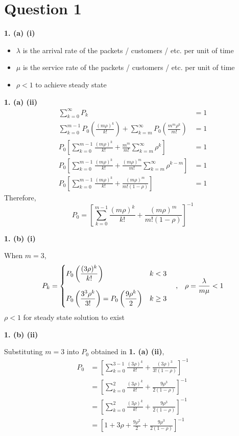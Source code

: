 \documentclass[12pt, a4paper]{article}
\begin{document}
\section*{Question 1}

\textbf{1. (a) (i)}
\begin{itemize}
  \item \(\lambda\) is the arrival rate of the packets / customers / etc. per unit of time
  \item \(\mu\) is the service rate of the packets / customers / etc. per unit of time
  \item \(\rho < 1\) to achieve steady state
\end{itemize}

\vspace{1cm}
\noindent \textbf{1. (a) (ii)}
\begin{align*}
  \sum_{k=0}^{\infty} P_k &= 1 \\
  \sum_{k=0}^{m-1} P_0\left(\frac{(m\rho)^k}{k!}\right) +
    \sum_{k=m}^{\infty} P_0\left(\frac{m^m\rho^k}{m!}\right) &= 1 \\
  P_0 \left[\sum_{k=0}^{m-1} \frac{(m\rho)^k}{k!} + \frac{m^m}{m!}\sum_{k=m}^{\infty} \rho^k \right] &= 1 \\
  P_0 \left[\sum_{k=0}^{m-1} \frac{(m\rho)^k}{k!} + \frac{(m\rho)^m}{m!}\sum_{k=m}^{\infty} \rho^{k-m} \right] &= 1 \\
  P_0 \left[\sum_{k=0}^{m-1} \frac{(m\rho)^k}{k!} + \frac{(m\rho)^m}{m!(1-\rho)} \right] &= 1
\end{align*}
Therefore,
\[P_0 = \left[\sum_{k=0}^{m-1} \frac{(m\rho)^k}{k!} + \frac{(m\rho)^m}{m!(1-\rho)} \right]^{-1}\]

\vspace{1cm}
\noindent \textbf{1. (b) (i)}

\noindent When \(m = 3\),
\[
 P_k =
  \begin{dcases}
   P_0 \left(\frac{(3\rho)^k}{k!}\right) & k < 3 \\[1.5ex]
   P_0 \left(\frac{3^3\rho^k}{3!}\right) = P_0 \left(\frac{9\rho^k}{2}\right) & k \geq 3
  \end{dcases}
  \quad\text{,}\quad \rho = \frac{\lambda}{m\mu} < 1
\]
\(\rho < 1\) for steady state solution to exist

\newpage
\noindent \textbf{1. (b) (ii)}

\noindent Substituting \(m = 3\) into \(P_0\) obtained in \textbf{1. (a) (ii)},
\begin{align*}
  P_0 &= \left[\sum_{k=0}^{3-1} \frac{(3\rho)^k}{k!} + \frac{(3\rho)^3}{3!(1-\rho)} \right]^{-1} \\
  &= \left[\sum_{k=0}^{2} \frac{(3\rho)^k}{k!} + \frac{9\rho^3}{2(1-\rho)} \right]^{-1} \\
  &= \left[\sum_{k=0}^{2} \frac{(3\rho)^k}{k!} + \frac{9\rho^3}{2(1-\rho)} \right]^{-1} \\
  &= \left[1 + 3\rho + \frac{9\rho^2}{2} + \frac{9\rho^3}{2(1-\rho)}\right]^{-1}
\end{align*}
\end{document}
